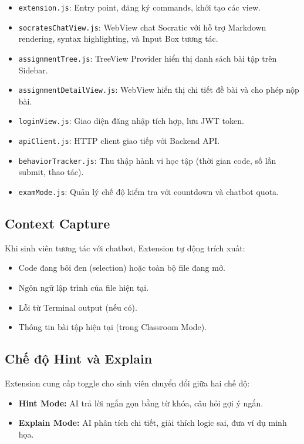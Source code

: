 \begin{itemize}
    \item \texttt{extension.js}: Entry point, đăng ký commands, khởi tạo các view.
    \item \texttt{socratesChatView.js}: WebView chat Socratic với hỗ trợ Markdown rendering, syntax highlighting, và Input Box tương tác.
    \item \texttt{assignmentTree.js}: TreeView Provider hiển thị danh sách bài tập trên Sidebar.
    \item \texttt{assignmentDetailView.js}: WebView hiển thị chi tiết đề bài và cho phép nộp bài.
    \item \texttt{loginView.js}: Giao diện đăng nhập tích hợp, lưu JWT token.
    \item \texttt{apiClient.js}: HTTP client giao tiếp với Backend API.
    \item \texttt{behaviorTracker.js}: Thu thập hành vi học tập (thời gian code, số lần submit, thao tác).
    \item \texttt{examMode.js}: Quản lý chế độ kiểm tra với countdown và chatbot quota.
\end{itemize}

\subsection{Context Capture}

Khi sinh viên tương tác với chatbot, Extension tự động trích xuất:
\begin{itemize}
    \item Code đang bôi đen (selection) hoặc toàn bộ file đang mở.
    \item Ngôn ngữ lập trình của file hiện tại.
    \item Lỗi từ Terminal output (nếu có).
    \item Thông tin bài tập hiện tại (trong Classroom Mode).
\end{itemize}

\subsection{Chế độ Hint và Explain}

Extension cung cấp toggle cho sinh viên chuyển đổi giữa hai chế độ:
\begin{itemize}
    \item \textbf{Hint Mode:} AI trả lời ngắn gọn bằng từ khóa, câu hỏi gợi ý ngắn.
    \item \textbf{Explain Mode:} AI phân tích chi tiết, giải thích logic sai, đưa ví dụ minh họa.
\end{itemize}

